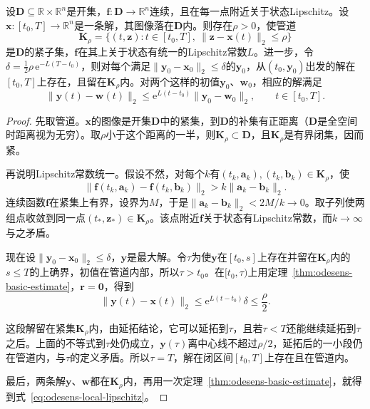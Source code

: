 \begin{theorem}[初值的局部Lipschitz依赖]
\label{thm:odesens-local-lipschitz}
设$\bm{D}\subseteq\mathbb{R}\times\mathbb{R}^{n}$是开集，$\bm{f}:\bm{D}\to\mathbb{R}^{n}$连续，且在每一点附近关于状态Lipschitz。设$\bm{x}:[t_0,T]\to\mathbb{R}^{n}$是一条解，其图像落在$\bm{D}$内。则存在$\rho>0$，使管道
\begin{equation}
 \bm{K}_\rho=\bigl\{(t,\bm{z}):t\in[t_0,T],\ \lVert\bm{z}-\bm{x}(t)\rVert_2\leq\rho\bigr\}
 \label{eq:odesens-tube}
\end{equation}
是$\bm{D}$的紧子集，$\bm{f}$在其上关于状态有统一的Lipschitz常数$L$。进一步，令$\delta=\tfrac12\rho\,\mathrm{e}^{-L(T-t_0)}$，则对每个满足$\lVert\bm{y}_0-\bm{x}_0\rVert_2\leq\delta$的$\bm{y}_0$，从$(t_0,\bm{y}_0)$出发的解在$[t_0,T]$上存在，且留在$\bm{K}_\rho$内。对两个这样的初值$\bm{y}_0$、$\bm{w}_0$，相应的解满足
\begin{equation}
 \lVert\bm{y}(t)-\bm{w}(t)\rVert_2\leq\mathrm{e}^{L(t-t_0)}\lVert\bm{y}_0-\bm{w}_0\rVert_2,\qquad t\in[t_0,T].
 \label{eq:odesens-local-lipschitz}
\end{equation}
\end{theorem}

\begin{proof}
先取管道。$\bm{x}$的图像是开集$\bm{D}$中的紧集，到$\bm{D}$的补集有正距离（$\bm{D}$是全空间时距离视为无穷）。取$\rho$小于这个距离的一半，则$\bm{K}_\rho\subset\bm{D}$，且$\bm{K}_\rho$是有界闭集，因而紧。

再说明Lipschitz常数统一。假设不然，对每个$k$有$(t_k,\bm{a}_k),(t_k,\bm{b}_k)\in\bm{K}_\rho$，使
\[
 \lVert\bm{f}(t_k,\bm{a}_k)-\bm{f}(t_k,\bm{b}_k)\rVert_2>k\lVert\bm{a}_k-\bm{b}_k\rVert_2.
\]
连续函数$\bm{f}$在紧集上有界，设界为$M$，于是$\lVert\bm{a}_k-\bm{b}_k\rVert_2<2M/k\to0$。取子列使两组点收敛到同一点$(t_\ast,\bm{z}_\ast)\in\bm{K}_\rho$。该点附近$\bm{f}$关于状态有Lipschitz常数，而$k\to\infty$与之矛盾。

现在设$\lVert\bm{y}_0-\bm{x}_0\rVert_2\leq\delta$，$\bm{y}$是最大解。令$\tau$为使$\bm{y}$在$[t_0,s]$上存在并留在$\bm{K}_\rho$内的$s\leq T$的上确界，初值在管道内部，所以$\tau>t_0$。在$[t_0,\tau)$上用定理~\ref{thm:odesens-basic-estimate}，$\bm{r}=\bm{0}$，得到
\[
 \lVert\bm{y}(t)-\bm{x}(t)\rVert_2\leq\mathrm{e}^{L(t-t_0)}\delta\leq\frac{\rho}{2}.
\]

这段解留在紧集$\bm{K}_\rho$内，由延拓结论，它可以延拓到$\tau$，且若$\tau<T$还能继续延拓到$\tau$之后。上面的不等式到$\tau$处仍成立，$\bm{y}(\tau)$离中心线不超过$\rho/2$，延拓后的一小段仍在管道内，与$\tau$的定义矛盾。所以$\tau=T$，解在闭区间$[t_0,T]$上存在且在管道内。

最后，两条解$\bm{y}$、$\bm{w}$都在$\bm{K}_\rho$内，再用一次定理~\ref{thm:odesens-basic-estimate}，就得到式~\eqref{eq:odesens-local-lipschitz}。
\end{proof}

